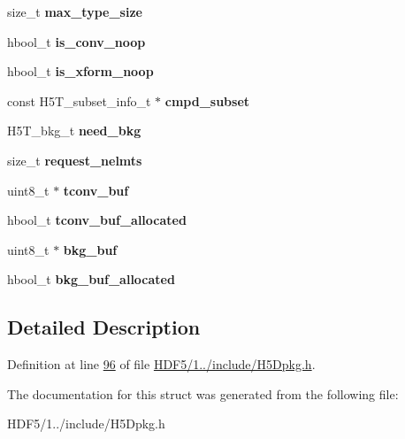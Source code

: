 \begin{DoxyCompactItemize}
size\+\_\+t {\bfseries max\+\_\+type\+\_\+size}
\item 
\mbox{\label{struct_h5_d__type__info__t_a429f018c9bb9e74dfd25a23a761281b2}} 
hbool\+\_\+t {\bfseries is\+\_\+conv\+\_\+noop}
\item 
\mbox{\label{struct_h5_d__type__info__t_ae21a7c4b6be0dc56d68f3711337293e1}} 
hbool\+\_\+t {\bfseries is\+\_\+xform\+\_\+noop}
\item 
\mbox{\label{struct_h5_d__type__info__t_aab47e71606e94eb636d2cd897c9194a6}} 
const H5\+T\+\_\+subset\+\_\+info\+\_\+t $\ast$ {\bfseries cmpd\+\_\+subset}
\item 
\mbox{\label{struct_h5_d__type__info__t_acea0eb73d27bdc68ef6651fe235d1793}} 
H5\+T\+\_\+bkg\+\_\+t {\bfseries need\+\_\+bkg}
\item 
\mbox{\label{struct_h5_d__type__info__t_a50606f1eeed755877bd85768ba0c67bf}} 
size\+\_\+t {\bfseries request\+\_\+nelmts}
\item 
\mbox{\label{struct_h5_d__type__info__t_a5596707db36a180c522e6f490a78bde5}} 
uint8\+\_\+t $\ast$ {\bfseries tconv\+\_\+buf}
\item 
\mbox{\label{struct_h5_d__type__info__t_a7822cf49796a72e38b1cd0260aaf954f}} 
hbool\+\_\+t {\bfseries tconv\+\_\+buf\+\_\+allocated}
\item 
\mbox{\label{struct_h5_d__type__info__t_a846c1433c739216a3511415912149fcc}} 
uint8\+\_\+t $\ast$ {\bfseries bkg\+\_\+buf}
\item 
\mbox{\label{struct_h5_d__type__info__t_a1b44a92ba804695431d766b95d7565a2}} 
hbool\+\_\+t {\bfseries bkg\+\_\+buf\+\_\+allocated}
\end{DoxyCompactItemize}


\subsection{Detailed Description}


Definition at line \hyperlink{_h_d_f5_21_810_81_2include_2_h5_dpkg_8h_source_l00096}{96} of file \hyperlink{_h_d_f5_21_810_81_2include_2_h5_dpkg_8h_source}{H\+D\+F5/1../include/\+H5\+Dpkg.\+h}.



The documentation for this struct was generated from the following file\+:\begin{DoxyCompactItemize}
\item 
H\+D\+F5/1../include/\+H5\+Dpkg.\+h\end{DoxyCompactItemize}
